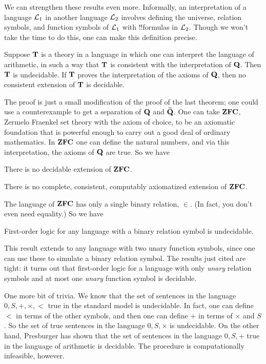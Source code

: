 \documentclass[../../../include/open-logic-section]{subfiles}
\begin{document}


We can strengthen these results even more. Informally, an
interpretation of a language $\mathcal L_1$ in another language
$\mathcal L_2$ involves defining the universe, relation symbols, and
function symbols of $\mathcal L_1$ with !!{formula}s in
$\mathcal L_2$. Though we won't take the time to do this, one can make
this definition precise.

\begin{thm}
  Suppose $\mathbf{T}$ is a theory in a language in which one can
  interpret the language of arithmetic, in such a way that $\mathbf{T}$ is
  consistent with the interpretation of $\mathbf{Q}$. Then $\mathbf{T}$ is
  undecidable. If $\mathbf{T}$ proves the interpretation of the axioms of
  $\mathbf{Q}$, then no consistent extension of $\mathbf{T}$ is decidable.
\end{thm}

The proof is just a small modification of the proof of the last
theorem; one could use a counterexample to get a separation of $\mathbf{Q}$ and
$\mathbf{\bar Q}$. One can take $\mathbf{ZFC}$, Zermelo Fraenkel set theory with the
axiom of choice, to be an axiomatic foundation that is powerful enough
to carry out a good deal of ordinary mathematics. In $\mathbf{ZFC}$ one
can define the natural numbers, and via this interpretation, the
axioms of $\mathbf{Q}$ are true. So we have

\begin{cor}
There is no decidable extension of $\mathbf{ZFC}$.
\end{cor}

\begin{cor}
There is no complete, consistent, computably axiomatized extension of
$\mathbf{ZFC}$. 
\end{cor}

The language of $\mathbf{ZFC}$ has only a single binary relation,
$\in$. (In fact, you don't even need equality.) So we have

\begin{cor}
First-order logic for any language with a binary relation symbol is
undecidable.
\end{cor}

This result extends to any language with two unary function symbols,
since one can use these to simulate a binary relation symbol. The
results just cited are tight: it turns out that first-order logic for
a language with only {\em unary} relation symbols and at most one
{\em unary} function symbol is decidable.

One more bit of trivia. We know that the set of sentences in the
language $0,S,+,\times,<$ true in the standard model is
undecidable. In fact, one can define $<$ in terms of the other
symbols, and then one can define $+$ in terms of $\times$ and $S$. So
the set of true sentences in the language $0,S,\times$ is
undecidable. On the other hand, Presburger has shown that the set of
sentences in the language $0,S,+$ true in the language of arithmetic
is decidable. The procedure is computationally infeasible, however.
\end{document}
